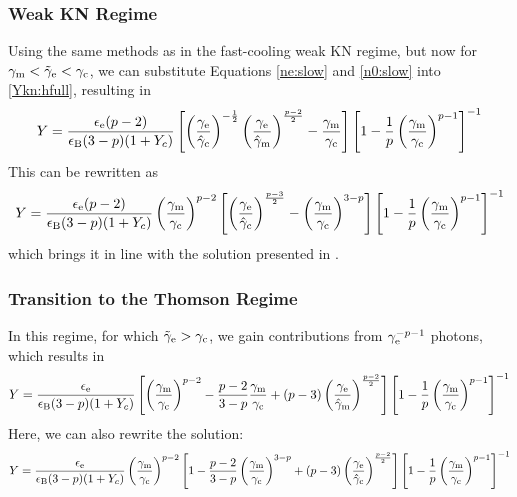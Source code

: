\documentclass[fleqn,usenatbib]{mnras}
\begin{document}
\subsubsection{Weak KN Regime}

Using the same methods as in the fast-cooling weak KN regime, but now for $\gamma_{\rm{m}} < \tilde{\gamma}_{\rm{e}} < \gamma_{\rm{c}}$, we can substitute Equations \ref{ne:slow} and \ref{n0:slow} into \ref{Ykn:hfull}, resulting in
\begin{equation}
\label{Ykn:weaks}
    Y=\frac{\epsilon_{\rm e}(p-2)}{\epsilon_{\rm B}(3-p)(1+Y_c)}\left[\left(\frac{\gamma_{\rm e}}{\hat{\gamma}_{\rm c}}\right)^{-\frac{1}{2}}\left(\frac{\gamma_{\rm e}}{\hat{\gamma}_{\rm m}}\right)^{\frac{p-2}{2}}-\frac{\gamma_{\rm m}}{\gamma_{\rm c}}\right]\left[1-\frac{1}{p}\left(\frac{\gamma_{\rm m}}{\gamma_{\rm c}}\right)^{p-1}\right]^{-1}
\end{equation}
This can be rewritten as 
\begin{equation}
\label{Ykn:weakalt}
    Y =\frac{\epsilon_{\rm e}(p-2)}{\epsilon_{\rm B}(3-p)(1+Y_c)}\left(\frac{\gamma_{\rm m}}{\gamma_{\rm c}}\right)^{p-2}\left[\left(\frac{\gamma_{\rm e}}{\hat{\gamma}_{\rm c}}\right)^{\frac{p-3}{2}}-\left(\frac{\gamma_{\rm m}}{\gamma_{\rm c}}\right)^{3-p}\right]\left[1-\frac{1}{p}\left(\frac{\gamma_{\rm m}}{\gamma_{\rm c}}\right)^{p-1}\right]^{-1}
\end{equation}
which brings it in line with the solution presented in \citet{Nakar}.

\subsubsection{Transition to the Thomson Regime}

In this regime, for which $\tilde{\gamma}_{\rm{e}} > \gamma_{\rm{c}}$, we gain contributions from $\gamma_{\rm e}^{-p-1}$ photons, which results in
\begin{equation}
\label{Ykn:trans}
    Y=\frac{\epsilon_{\rm e}}{\epsilon_{\rm B}(3-p)(1+Y_c)}\left[\left(\frac{\gamma_{\rm m}}{\gamma_{\rm c}}\right)^{p-2}-\frac{p-2}{3-p}\frac{\gamma_{\rm m}}{\gamma_{\rm c}}+(p-3)\left(\frac{\gamma_{\rm e}}{\hat{\gamma}_{\rm m}}\right)^{\frac{p-2}{2}}\right]\left[1-\frac{1}{p}\left(\frac{\gamma_{\rm m}}{\gamma_{\rm c}}\right)^{p-1}\right]^{-1}
\end{equation}
Here, we can also rewrite the solution:
\begin{equation}
\label{Ykn:translow}
    Y=\frac{\epsilon_{\rm e}}{\epsilon_{\rm B}(3-p)(1+Y_c)}\left(\frac{\gamma_{\rm m}}{\gamma_{\rm c}}\right)^{p-2}\left[1-\frac{p-2}{3-p}\left(\frac{\gamma_{\rm m}}{\gamma_{\rm c}}\right)^{3-p}+(p-3)\left(\frac{\gamma_{\rm e}}{\hat{\gamma}_{\rm c}}\right)^{\frac{p-2}{2}}\right]\left[1-\frac{1}{p}\left(\frac{\gamma_{\rm m}}{\gamma_{\rm c}}\right)^{p-1}\right]^{-1}
\end{equation}
\end{document}
